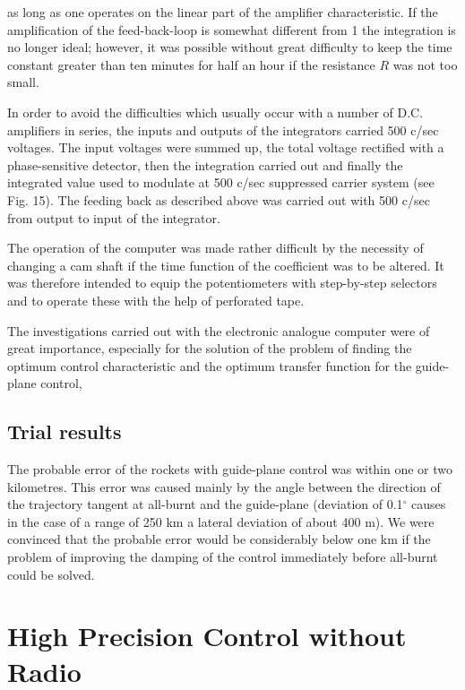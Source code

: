 \documentclass[12pt, a4paper]{article}
\begin{document}
\begin{equation}
\end{equation}

as long as one operates on the linear part of the amplifier characteristic. If the amplification of the feed-back-loop is somewhat different from 1 the integration is no longer ideal; however, it was possible without great difficulty to keep the time constant greater than ten minutes for half an hour if the resistance $R$ was not too small.

In order to avoid the difficulties which usually occur with a number of D.C. amplifiers in series, the inputs and outputs of the integrators carried 500 c/sec voltages. The input voltages were summed up, the total voltage rectified with a phase-sensitive detector, then the integration carried out and finally the integrated value used to modulate at 500 c/sec suppressed carrier system (see Fig. 15). The feeding back as described above was carried out with 500 c/sec from output to input of the integrator.

The operation of the computer was made rather difficult by the necessity of changing a cam shaft if the time function of the coefficient was to be altered. It was therefore intended to equip the potentiometers with step-by-step selectors and to operate these with the help of perforated tape.

The investigations carried out with the electronic analogue computer were of great importance, especially for the solution of the problem of finding the optimum control characteristic and the optimum transfer function for the guide-plane control,

\subsection{Trial results}

The probable error of the rockets with guide-plane control was within one or two kilometres. This error was caused mainly by the angle between the direction of the trajectory tangent at all-burnt and the guide-plane (deviation of 0.1$^{\circ}$ causes in the case of a range of 250 km a lateral deviation of about 400 m). We were convinced that the probable error would be considerably below one km if the problem of improving the damping of the control immediately before all-burnt could be solved.

\section{High Precision Control without Radio}
\end{document}
